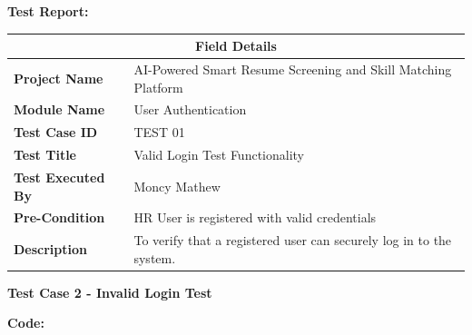 \documentclass[12pt,a4paper]{report}
\begin{document}
\textbf{Test Report:}
\begin{table}[H]
\centering
\renewcommand{\arraystretch}{1.5}
\begin{tabular}{|p{4.5cm}|p{9.5cm}|}
\hline
\multicolumn{2}{|c|}{\textbf{Field Details}} \\ \hline
\textbf{Project Name} & AI-Powered Smart Resume Screening and Skill Matching Platform \\ \hline
\textbf{Module Name} & User Authentication \\ \hline
\textbf{Test Case ID} & TEST 01 \\ \hline
\textbf{Test Title} & Valid Login Test Functionality \\ \hline
\textbf{Test Executed By} & Moncy Mathew \\ \hline
\textbf{Pre-Condition} & HR User is registered with valid credentials \\ \hline
\textbf{Description} & To verify that a registered user can securely log in to the system. \\ \hline
\end{tabular}
\end{table}
\vspace{0.5cm}
\textbf{Test Case 2 - Invalid Login Test}

\textbf{Code:}
\end{document}
